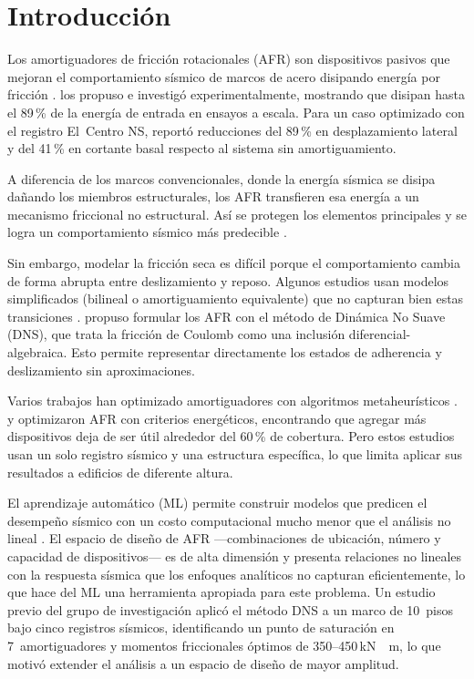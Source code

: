 \documentclass[preprint,12pt,authoryear]{elsarticle}
\newcommand{\KM}{\,\si{kN{\cdot}m}}
\begin{document}
\section{Introducción}
\label{sec:intro}

Los amortiguadores de fricción rotacionales (AFR) son dispositivos pasivos que
mejoran el comportamiento sísmico de marcos de acero disipando energía por
fricción \citep{pall_friction_1980, pall_response_1982, jaisee_state---art_2021}.
\citet{Mualla2002} los propuso e investigó experimentalmente, mostrando que
disipan hasta el 89\,\% de la energía de entrada en ensayos a escala. Para un
caso optimizado con el registro El~Centro NS, reportó reducciones del 89\,\% en
desplazamiento lateral y del 41\,\% en cortante basal respecto al sistema sin
amortiguamiento.

A diferencia de los marcos convencionales, donde la energía sísmica se disipa
dañando los miembros estructurales, los AFR transfieren esa energía a un
mecanismo friccional no estructural. Así se protegen los elementos principales
y se logra un comportamiento sísmico más predecible
\citep{de_domenico_editorial_2020}.

Sin embargo, modelar la fricción seca es difícil porque el comportamiento cambia
de forma abrupta entre deslizamiento y reposo. Algunos estudios usan modelos
simplificados (bilineal o amortiguamiento equivalente) que no capturan bien estas
transiciones \citep{lee_seismic_2025, Jarrahi2020jbe}. \citet{Namorado2024}
propuso formular los AFR con el método de Dinámica No Suave (DNS), que trata la
fricción de Coulomb como una inclusión diferencial-algebraica. Esto permite
representar directamente los estados de adherencia y deslizamiento sin
aproximaciones.

Varios trabajos han optimizado amortiguadores con algoritmos metaheurísticos
\citep{moreschi_design_2003, moghaddam_optimal_2022, miguel_simultaneous_2016,
ontiveros-perez_reliability-based_2019}. \citet{Jarrahi2020jbe} y
\citet{Jarrahi2020sdee} optimizaron AFR con criterios energéticos, encontrando
que agregar más dispositivos deja de ser útil alrededor del 60\,\% de cobertura.
Pero estos estudios usan un solo registro sísmico y una estructura específica,
lo que limita aplicar sus resultados a edificios de diferente altura.

El aprendizaje automático (ML) permite construir modelos que predicen el
desempeño sísmico con un costo computacional mucho menor que el análisis no
lineal \citep{Kazemi2022}. El espacio de diseño de AFR ---combinaciones de
ubicación, número y capacidad de dispositivos--- es de alta dimensión y
presenta relaciones no lineales con la respuesta sísmica que los enfoques
analíticos no capturan eficientemente, lo que hace del ML una herramienta
apropiada para este problema. Un estudio previo del grupo de investigación
\citep{Ponce2026} aplicó el método DNS a un marco de 10~pisos bajo cinco
registros sísmicos, identificando un punto de saturación en 7~amortiguadores y
momentos friccionales óptimos de 350--450\KM, lo que motivó extender el análisis
a un espacio de diseño de mayor amplitud.
\end{document}
